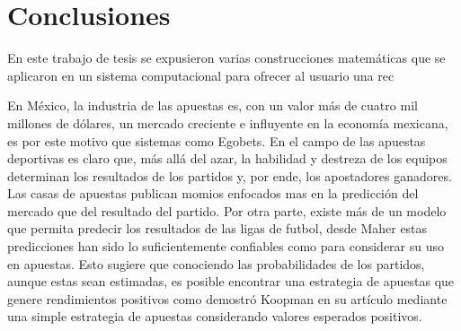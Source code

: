 %
\chapter{Conclusiones}

En este trabajo de tesis se expusieron varias construcciones matemáticas que se aplicaron en un sistema computacional para ofrecer al usuario una rec

En México, la industria de las apuestas es, con un valor más de cuatro mil millones de dólares, un mercado creciente e influyente en la economía mexicana, es por este motivo que sistemas como Egobets. En el campo de las apuestas deportivas es claro que, más allá del azar, la habilidad y destreza de los equipos determinan los resultados de los partidos y, por ende, los apostadores ganadores. Las casas de apuestas publican momios enfocados mas en la predicción del mercado que del resultado del partido. Por otra parte, existe más de un modelo que permita predecir los resultados de las ligas de futbol, desde Maher \cite{maher1982modelling} estas predicciones han sido lo suficientemente confiables como para considerar su uso en apuestas. Esto sugiere que conociendo las probabilidades de los partidos, aunque estas sean estimadas, es posible encontrar una estrategia de apuestas que genere rendimientos positivos como demostró Koopman en su artículo \cite{koopman2013dynamic} mediante una simple estrategia de apuestas considerando valores esperados positivos.




